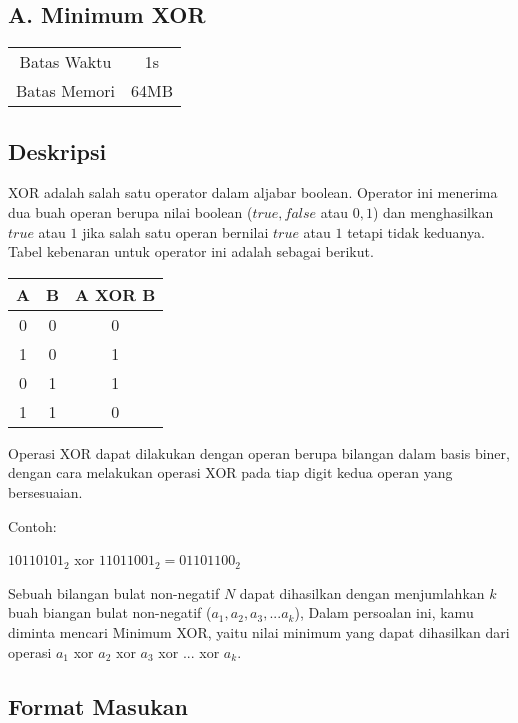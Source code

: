 \documentclass{article}
\begin{document}
\begin{center}
    \section*{A. Minimum XOR} %

    \begin{tabular}{ | c c | }
        \hline
        Batas Waktu  & 1s \\    %
        Batas Memori & 64MB \\  %
        \hline
    \end{tabular}
\end{center}

\subsection*{Deskripsi}

XOR adalah salah satu operator dalam aljabar boolean. Operator ini menerima dua buah operan berupa nilai boolean ($true, false$ 
atau $0, 1$) dan menghasilkan $true$ atau $1$ jika salah satu operan bernilai $true$ atau $1$ tetapi tidak keduanya. 
Tabel kebenaran untuk operator ini adalah sebagai berikut.

\begin{center}
\begin{tabular}{c|c|c}
A & B & A XOR B \\ \hline
0 & 0 & 0       \\
1 & 0 & 1       \\
0 & 1 & 1       \\
1 & 1 & 0
\end{tabular}
\end{center}
Operasi XOR dapat dilakukan dengan operan berupa bilangan dalam basis biner,
 dengan cara melakukan operasi XOR pada tiap digit kedua operan yang bersesuaian.

Contoh:
\begin{center}
$10110101_2$ xor $11011001_2 = 01101100_2$
\end{center}

Sebuah bilangan bulat non-negatif $N$ dapat dihasilkan dengan menjumlahkan $k$ buah biangan bulat non-negatif ($a_1, a_2, a_3, ... a_k$), 
Dalam persoalan ini, kamu diminta mencari Minimum XOR, yaitu nilai minimum yang dapat dihasilkan dari operasi  $a_1$ xor $a_2$ xor $a_3$ xor $...$ xor $a_k$.

\subsection*{Format Masukan}
\end{document}
